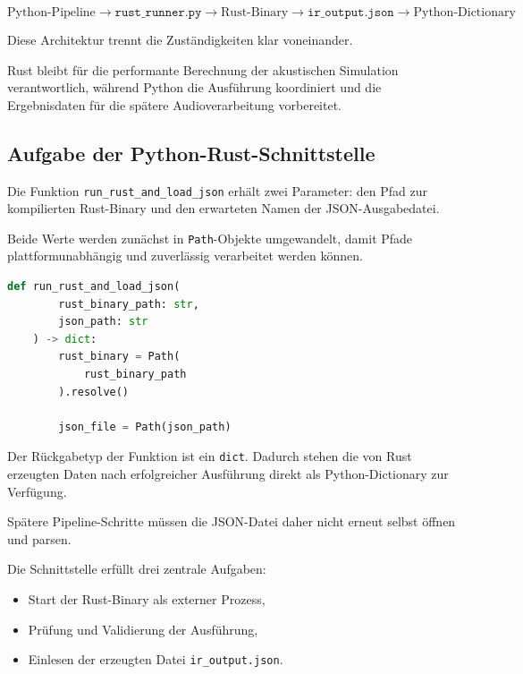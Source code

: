 \documentclass{article}
\begin{document}
    \[
        \text{Python-Pipeline}
        \rightarrow
        \texttt{rust\_runner.py}
        \rightarrow
        \text{Rust-Binary}
        \rightarrow
        \texttt{ir\_output.json}
        \rightarrow
        \text{Python-Dictionary}
    \]

    Diese Architektur trennt die Zuständigkeiten klar voneinander.

    Rust bleibt für die performante Berechnung der akustischen Simulation
    verantwortlich, während Python die Ausführung koordiniert und die
    Ergebnisdaten für die spätere Audioverarbeitung vorbereitet.

    \subsection{Aufgabe der Python-Rust-Schnittstelle}
    \label{subsec:python-rust-interface}

    Die Funktion \texttt{run\_rust\_and\_load\_json} erhält zwei Parameter:
    den Pfad zur kompilierten Rust-Binary und den erwarteten Namen der
    JSON-Ausgabedatei.

    Beide Werte werden zunächst in \texttt{Path}-Objekte umgewandelt, damit Pfade
    plattformunabhängig und zuverlässig verarbeitet werden können.

    \begin{lstlisting}[language=Python]
    def run_rust_and_load_json(
        rust_binary_path: str,
        json_path: str
    ) -> dict:
        rust_binary = Path(
            rust_binary_path
        ).resolve()

        json_file = Path(json_path)
    \end{lstlisting}

    Der Rückgabetyp der Funktion ist ein \texttt{dict}. Dadurch stehen die von
    Rust erzeugten Daten nach erfolgreicher Ausführung direkt als
    Python-Dictionary zur Verfügung.

    Spätere Pipeline-Schritte müssen die JSON-Datei daher nicht erneut selbst
    öffnen und parsen.

    Die Schnittstelle erfüllt drei zentrale Aufgaben:

    \begin{itemize}
        \item Start der Rust-Binary als externer Prozess,
        \item Prüfung und Validierung der Ausführung,
        \item Einlesen der erzeugten Datei
        \texttt{ir\_output.json}.
    \end{itemize}
\end{document}
